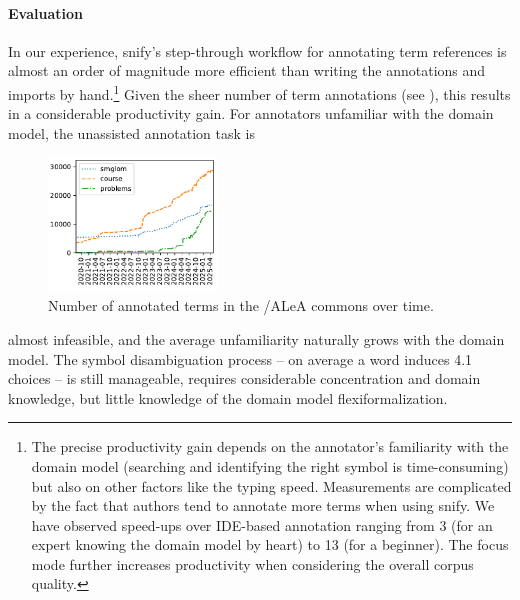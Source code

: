 \documentclass[runningheads]{llncs}
\def\edited#1{#1}
\newcommand\ALeA{\textsf{ALeA}\xspace}
\newcommand\snify{\textsf{snify}\xspace}
\begin{document}
\paragraph{Evaluation}
In our experience, \snify's step-through workflow for annotating term references 
is almost an order of magnitude more efficient than writing the
annotations and imports by hand.\footnote{
        The precise productivity gain depends on the annotator's
        familiarity with the domain model (\edited{searching and identifying}
        the right symbol is time-consuming) but also on other factors like
        the typing speed.
        Measurements are complicated by the fact that
        authors tend to annotate more terms when using \snify.
        We have observed speed-ups over IDE-based annotation
        ranging from 3 (for an expert knowing the domain model by heart)
        to 13 (for a beginner).
        The focus mode further increases productivity
        when considering the overall corpus quality.
}
Given the sheer number of term annotations (see ),
this results in a considerable productivity gain.
For annotators unfamiliar with the domain model, the unassisted annotation task is
\begin{figure}
    \vskip-0.7cm
  \centering
  \includegraphics[width=0.4\textwidth]{../img/annocounts.pdf}
  \caption{Number of annotated terms in the \sTeX/\ALeA commons over time.}\label{fig:annocounts}
  \vskip-0.7cm
\end{figure}
almost infeasible, and the average unfamiliarity naturally grows with the domain
model. The symbol disambiguation process -- on average a word induces 4.1 choices
-- is still manageable,
requires considerable concentration and domain knowledge, but little knowledge of the
domain model flexiformalization.
\end{document}
